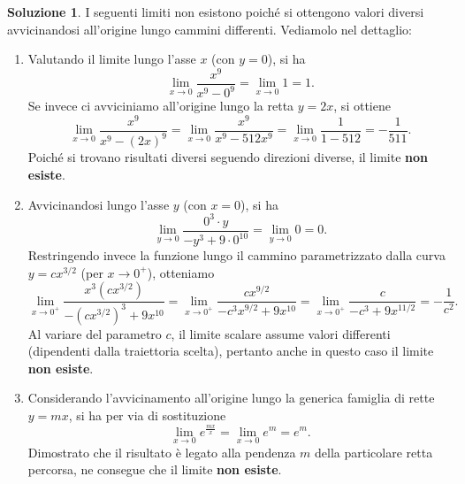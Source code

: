 \documentclass[12pt,a4paper]{article}
\theoremstyle{definition}
\newtheorem{sol}{Soluzione}
\begin{document}
\begin{sol}
    I seguenti limiti non esistono poiché si ottengono valori diversi avvicinandosi all'origine lungo cammini differenti. Vediamolo nel dettaglio:
    \begin{enumerate}
        \item Valutando il limite lungo l'asse $x$ (con $y=0$), si ha
              \[ \lim_{x \to 0} \frac{x^9}{x^9 - 0^9} = \lim_{x \to 0} 1 = 1. \]
              Se invece ci avviciniamo all'origine lungo la retta $y=2x$, si ottiene
              \[ \lim_{x \to 0} \frac{x^9}{x^9 - (2x)^9} = \lim_{x \to 0} \frac{x^9}{x^9 - 512x^9} = \lim_{x \to 0} \frac{1}{1 - 512} = -\frac{1}{511}. \]
              Poiché si trovano risultati diversi seguendo direzioni diverse, il limite \textbf{non esiste}.
        \item Avvicinandosi lungo l'asse $y$ (con $x=0$), si ha
              \[ \lim_{y \to 0} \frac{0^3 \cdot y}{-y^3 + 9 \cdot 0^{10}} = \lim_{y \to 0} 0 = 0. \]
              Restringendo invece la funzione lungo il cammino parametrizzato dalla curva $y=cx^{3/2}$ (per $x \to 0^+$), otteniamo
              \[ \lim_{x \to 0^+} \frac{x^3(cx^{3/2})}{-(cx^{3/2})^3 + 9x^{10}} = \lim_{x \to 0^+} \frac{c x^{9/2}}{-c^3 x^{9/2} + 9x^{10}} = \lim_{x \to 0^+} \frac{c}{-c^3 + 9x^{11/2}} = -\frac{1}{c^2}. \]
              Al variare del parametro $c$, il limite scalare assume valori differenti (dipendenti dalla traiettoria scelta), pertanto anche in questo caso il limite \textbf{non esiste}.
        \item Considerando l'avvicinamento all'origine lungo la generica famiglia di rette $y = mx$, si ha per via di sostituzione
              \[ \lim_{x \to 0} e^{\frac{mx}{x}} = \lim_{x \to 0} e^m = e^m. \]
              Dimostrato che il risultato è legato alla pendenza $m$ della particolare retta percorsa, ne consegue che il limite \textbf{non esiste}.
    \end{enumerate}
\end{sol}
\end{document}
